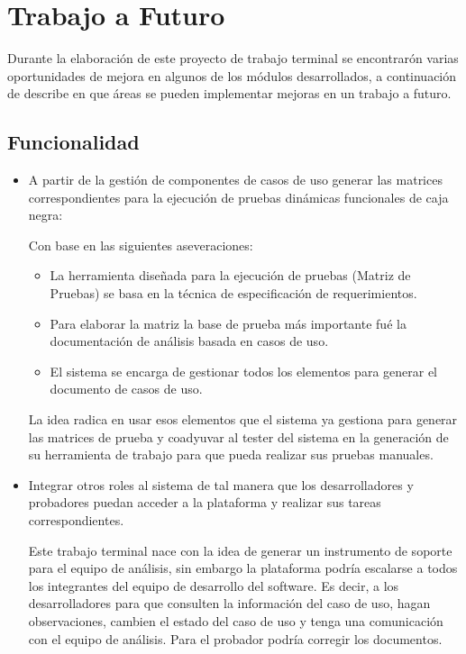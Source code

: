 \chapter{Trabajo a Futuro} \label{cap:once}
Durante la elaboración de este proyecto de trabajo terminal se encontrarón varias oportunidades de mejora en algunos de los módulos desarrollados, a continuación de describe en que áreas se pueden implementar mejoras en un trabajo a futuro.

\section{Funcionalidad}
\begin{itemize}
	\item A partir de la gestión de componentes de casos de uso generar las matrices correspondientes para la ejecución de pruebas dinámicas funcionales de caja negra:
	
	Con base en las siguientes aseveraciones:
	\begin{itemize}
	\item La herramienta diseñada para la ejecución de pruebas (Matriz de Pruebas) se basa en la  técnica de especificación de requerimientos.
	\item Para elaborar la matriz la base de prueba más importante fué la documentación de análisis basada en casos de uso.
	\item El sistema se encarga de gestionar todos los elementos para generar el documento de casos de uso.
	\end{itemize}

	La idea radica en usar esos elementos que el sistema ya gestiona para generar las matrices de prueba y coadyuvar al tester del sistema en la generación  de su herramienta de trabajo para que pueda realizar sus pruebas manuales.
	
	\item Integrar otros roles al sistema de tal manera que los desarrolladores y probadores puedan acceder a la plataforma y realizar sus tareas correspondientes.
	
	Este trabajo terminal nace con la idea de generar un instrumento de soporte para el equipo de análisis, sin embargo la plataforma podría escalarse a todos los integrantes del equipo de desarrollo del software. Es decir, a los desarrolladores para que consulten la información del caso de uso, hagan observaciones, cambien el estado del caso de uso y tenga una comunicación con el equipo de análisis. Para el probador podría corregir los documentos.
	
\end{itemize}
 